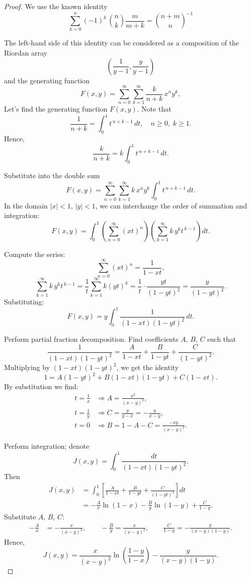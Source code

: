 \documentclass[12pt]{article}
\begin{document}
\begin{proof}
We use the known identity \cite{Prudnikov}
\begin{equation}\label{LidenPrudnik}
\sum_{k=0}^{n}{{(-1)^{k}\,{{n}\choose{k}}}\frac{m}{m
 +k}}=\binom{n+m}{n}^{-1}
\end{equation}

The left-hand side of this identity can be considered as a composition of the Riordan array
$$
\left(\frac{1}{y-1},\frac{y}{y-1}\right)
$$
and the generating function
\[
F(x,y) = \sum_{n=0}^{\infty} \sum_{k=1}^{\infty} \frac{k}{n+k} \, x^n y^k,
\]
Let's find the generating function $F(x,y)$.
Note that
   \[
   \frac{1}{n+k} = \int_0^1 t^{\,n+k-1} \, dt, \quad n \ge 0,\; k \ge 1.
   \]
   Hence,
   \[
   \frac{k}{n+k} = k \int_0^1 t^{\,n+k-1} \, dt.
   \]

Substitute into the double sum
   \[
   F(x,y) = \sum_{n=0}^{\infty} \sum_{k=1}^{\infty} k \, x^n y^k \int_0^1 t^{\,n+k-1} \, dt.
   \]
   In the domain $|x|<1$, $|y|<1$, we can interchange the order of summation and integration:
   \[
   F(x,y) = \int_0^1 \left( \sum_{n=0}^{\infty} (xt)^n \right) 
           \left( \sum_{k=1}^{\infty} k \, y^k t^{\,k-1} \right) dt.
   \]

 Compute the series:
   \[
   \sum_{n=0}^{\infty} (xt)^n = \frac{1}{1-xt},
   \]
   \[
   \sum_{k=1}^{\infty} k \, y^k t^{\,k-1} 
       = \frac{1}{t} \sum_{k=1}^{\infty} k (yt)^k 
       = \frac{1}{t} \cdot \frac{yt}{(1-yt)^2}
       = \frac{y}{(1-yt)^2}.
   \]
   Substituting:
   \[
   F(x,y) = y \int_0^1 \frac{1}{(1-xt)(1-yt)^2} \, dt.
   \]

Perform partial fraction decomposition.   Find coefficients $A$, $B$, $C$ such that
   \[
   \frac{1}{(1-xt)(1-yt)^2} = \frac{A}{1-xt} + \frac{B}{1-yt} + \frac{C}{(1-yt)^2}.
   \]
   Multiplying by $(1-xt)(1-yt)^2$, we get the identity
   \[
   1 = A(1-yt)^2 + B(1-xt)(1-yt) + C(1-xt).
   \]
   By substitution we find:
   \[
   \begin{aligned}
   t = \frac{1}{x} &\Rightarrow A = \frac{x^2}{(x-y)^2},\\[2mm]
   t = \frac{1}{y} &\Rightarrow C = \frac{y}{y-x} = -\frac{y}{x-y},\\[2mm]
   t = 0 &\Rightarrow B = 1 - A - C = \frac{-xy}{(x-y)^2}.
   \end{aligned}
   \]

Perform integration; denote
   \[
   J(x,y) = \int_0^1 \frac{dt}{(1-xt)(1-yt)^2}.
   \]
   Then
   \[
   \begin{aligned}
   J(x,y) &= \int_0^1 \left[ \frac{A}{1-xt} + \frac{B}{1-yt} + \frac{C}{(1-yt)^2} \right] dt \\[1mm]
          &= -\frac{A}{x} \ln(1-x) - \frac{B}{y} \ln(1-y) + \frac{C}{1-y}.
   \end{aligned}
   \]
   Substitute $A$, $B$, $C$:
   \[
   \begin{aligned}
   -\frac{A}{x} &= -\frac{x}{(x-y)^2},\qquad
   -\frac{B}{y} = \frac{x}{(x-y)^2},\qquad
   \frac{C}{1-y} = -\frac{y}{(x-y)(1-y)}.
   \end{aligned}
   \]
   Hence,
   \[
   J(x,y) = \frac{x}{(x-y)^2} \ln\!\left( \frac{1-y}{1-x} \right) - \frac{y}{(x-y)(1-y)}.
   \]


\end{proof}
\end{document}
